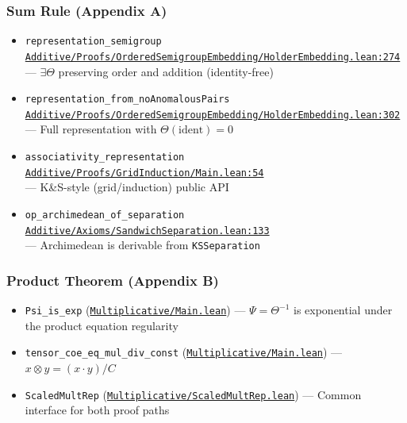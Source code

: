 \documentclass[11pt]{article}
\theoremstyle{definition}
\theoremstyle{remark}
\begin{document}
\subsubsection*{Sum Rule (Appendix A)}
\begin{itemize}
\item \texttt{representation\_semigroup}\\
      \href{https://github.com/zariuq/ks-foundations-of-inference/blob/main/KnuthSkilling/Additive/Proofs/OrderedSemigroupEmbedding/HolderEmbedding.lean\#L274}{\texttt{Additive/Proofs/OrderedSemigroupEmbedding/HolderEmbedding.lean:274}}\\
      --- $\exists \Theta$ preserving order and addition (identity-free)
\item \texttt{representation\_from\_noAnomalousPairs}\\
      \href{https://github.com/zariuq/ks-foundations-of-inference/blob/main/KnuthSkilling/Additive/Proofs/OrderedSemigroupEmbedding/HolderEmbedding.lean\#L302}{\texttt{Additive/Proofs/OrderedSemigroupEmbedding/HolderEmbedding.lean:302}}\\
      --- Full representation with $\Theta(\text{ident}) = 0$
\item \texttt{associativity\_representation}\\
      \href{https://github.com/zariuq/ks-foundations-of-inference/blob/main/KnuthSkilling/Additive/Proofs/GridInduction/Main.lean\#L54}{\texttt{Additive/Proofs/GridInduction/Main.lean:54}}\\
      --- K\&S-style (grid/induction) public API
\item \texttt{op\_archimedean\_of\_separation}\\
      \href{https://github.com/zariuq/ks-foundations-of-inference/blob/main/KnuthSkilling/Additive/Axioms/SandwichSeparation.lean\#L133}{\texttt{Additive/Axioms/SandwichSeparation.lean:133}}\\
      --- Archimedean is derivable from \texttt{KSSeparation}
\end{itemize}

\subsubsection*{Product Theorem (Appendix B)}
\begin{itemize}
\item \texttt{Psi\_is\_exp} (\href{https://github.com/zariuq/ks-foundations-of-inference/blob/main/KnuthSkilling/Multiplicative/Main.lean}{\texttt{Multiplicative/Main.lean}}) --- $\Psi = \Theta^{-1}$ is exponential under the product equation regularity
\item \texttt{tensor\_coe\_eq\_mul\_div\_const} (\href{https://github.com/zariuq/ks-foundations-of-inference/blob/main/KnuthSkilling/Multiplicative/Main.lean}{\texttt{Multiplicative/Main.lean}}) --- $x \otimes y = (x \cdot y)/C$
\item \texttt{ScaledMultRep} (\href{https://github.com/zariuq/ks-foundations-of-inference/blob/main/KnuthSkilling/Multiplicative/ScaledMultRep.lean}{\texttt{Multiplicative/ScaledMultRep.lean}}) --- Common interface for both proof paths
\end{itemize}
\end{document}
